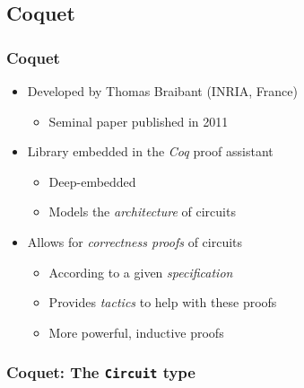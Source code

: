     \subsection{Coquet}
    \label{subsec:coquet}
        \begin{frame}
            \frametitle{Coquet}

            \begin{itemize}
                \item Developed by Thomas Braibant (INRIA, France)
                    \begin{itemize}
                        \item Seminal paper published in 2011
                    \end{itemize}
                \item Library embedded in the \emph{Coq} proof assistant
                    \begin{itemize}
                        \item Deep-embedded
                        \item Models the \emph{architecture} of circuits
                    \end{itemize}
                \item Allows for \emph{correctness proofs} of circuits
                    \begin{itemize}
                        \item According to a given \emph{specification}
                        \item Provides \emph{tactics} to help with these proofs
                        \item More powerful, inductive proofs
                    \end{itemize}
            \end{itemize}

        \end{frame}

        \begin{frame}
            \frametitle{Coquet: The \texttt{Circuit} type}
        \end{frame}
        
